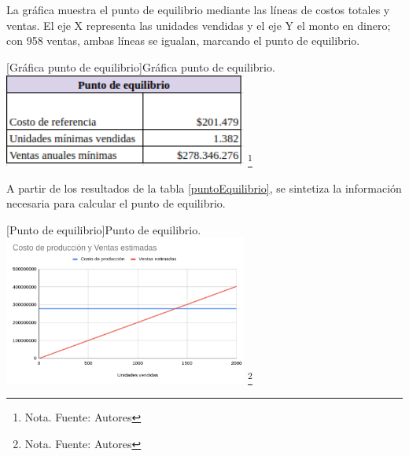 La gráfica muestra el punto de equilibrio mediante las líneas de costos totales y ventas. El eje X representa las unidades vendidas y el eje Y el monto en dinero; con 958 ventas, ambas líneas se igualan, marcando el punto de equilibrio.

\vspace{2mm}
\begin{minipage}{0.9\textwidth}
\centering
{}[Gráfica punto de equilibrio]{Gráfica punto de equilibrio.}
\label{graficaEquilibrio}
\includegraphics[width=0.6\textwidth]{Content/Images/AF/PuntoDeEquilibrio_PuntoDeEqui.png}
\footnote{Nota. \textup{Fuente: Autores}}
\end{minipage}

A partir de los resultados de la tabla \ref{puntoEquilibrio}, se sintetiza la información necesaria para calcular el punto de equilibrio.

\vspace{2mm}
\begin{minipage}{0.9\textwidth}
\centering
{}[Punto de equilibrio]{Punto de equilibrio.}
\label{puntoEquilibrio}
\includegraphics[width=0.6\textwidth]{Content/Images/AF/PuntoDeEquilibrio_CostosYVentas.png}
\footnote{Nota. \textup{Fuente: Autores}}
\end{minipage}